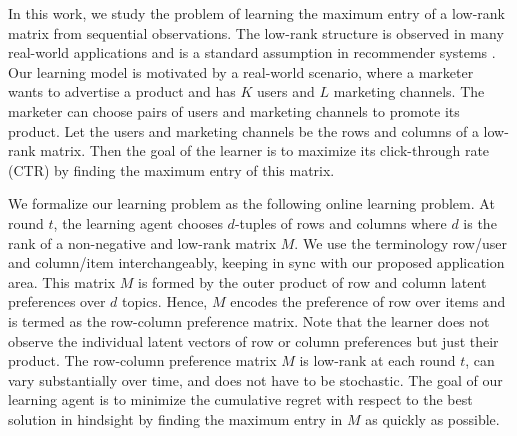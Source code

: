 In this work, we study the problem of learning the maximum entry of a low-rank matrix from sequential observations. The low-rank structure is observed in many real-world applications and is a standard assumption in recommender systems \citep{koren2009matrix,ricci2011liorrokach}. Our learning model is motivated by a real-world scenario, where a marketer wants to advertise a product and has $K$ users and $L$ marketing channels. The marketer can choose pairs of users and marketing channels to promote its product. Let the users and marketing channels be the rows and columns of a low-rank matrix. Then the goal of the learner is to maximize its click-through rate (CTR) by finding the maximum entry of this matrix.




We formalize our learning problem as the following online learning problem. At round $t$, the learning agent chooses $d$-tuples of rows and columns where $d$ is the rank of a non-negative and low-rank matrix $M$. We use the terminology row/user and column/item interchangeably, keeping in sync with our proposed application area. This matrix $M$ is formed by the outer product of row and column latent preferences over $d$ topics. Hence, $M$ encodes the preference of row over items and is termed as the row-column preference matrix. Note that the learner does not observe the individual latent vectors of row or column preferences but just their product. The row-column preference matrix $M$ is low-rank at each round $t$, can vary substantially over time, and does not have to be stochastic. The goal of our learning agent is to minimize the cumulative regret with respect to the best solution in hindsight by finding the maximum entry in $M$ as quickly as possible.



